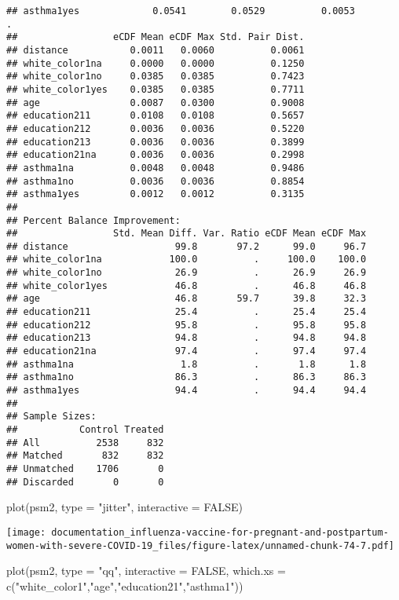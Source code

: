 \documentclass[
]{article}
\newenvironment{Shaded}{\begin{snugshade}}{\end{snugshade}}
\newcommand{\AttributeTok}[1]{\textcolor[rgb]{0.77,0.63,0.00}{#1}}
\newcommand{\ConstantTok}[1]{\textcolor[rgb]{0.00,0.00,0.00}{#1}}
\newcommand{\FunctionTok}[1]{\textcolor[rgb]{0.00,0.00,0.00}{#1}}
\newcommand{\NormalTok}[1]{#1}
\newcommand{\StringTok}[1]{\textcolor[rgb]{0.31,0.60,0.02}{#1}}
\begin{document}
\begin{verbatim}
## asthma1yes             0.0541        0.0529          0.0053          .
##                 eCDF Mean eCDF Max Std. Pair Dist.
## distance           0.0011   0.0060          0.0061
## white_color1na     0.0000   0.0000          0.1250
## white_color1no     0.0385   0.0385          0.7423
## white_color1yes    0.0385   0.0385          0.7711
## age                0.0087   0.0300          0.9008
## education211       0.0108   0.0108          0.5657
## education212       0.0036   0.0036          0.5220
## education213       0.0036   0.0036          0.3899
## education21na      0.0036   0.0036          0.2998
## asthma1na          0.0048   0.0048          0.9486
## asthma1no          0.0036   0.0036          0.8854
## asthma1yes         0.0012   0.0012          0.3135
## 
## Percent Balance Improvement:
##                 Std. Mean Diff. Var. Ratio eCDF Mean eCDF Max
## distance                   99.8       97.2      99.0     96.7
## white_color1na            100.0          .     100.0    100.0
## white_color1no             26.9          .      26.9     26.9
## white_color1yes            46.8          .      46.8     46.8
## age                        46.8       59.7      39.8     32.3
## education211               25.4          .      25.4     25.4
## education212               95.8          .      95.8     95.8
## education213               94.8          .      94.8     94.8
## education21na              97.4          .      97.4     97.4
## asthma1na                   1.8          .       1.8      1.8
## asthma1no                  86.3          .      86.3     86.3
## asthma1yes                 94.4          .      94.4     94.4
## 
## Sample Sizes:
##           Control Treated
## All          2538     832
## Matched       832     832
## Unmatched    1706       0
## Discarded       0       0
\end{verbatim}

\begin{Shaded}
\begin{Highlighting}[]
\FunctionTok{plot}\NormalTok{(psm2, }\AttributeTok{type =} \StringTok{"jitter"}\NormalTok{, }\AttributeTok{interactive =} \ConstantTok{FALSE}\NormalTok{)}
\end{Highlighting}
\end{Shaded}

\texttt{[image: documentation\_influenza-vaccine-for-pregnant-and-postpartum-women-with-severe-COVID-19\_files/figure-latex/unnamed-chunk-74-7.pdf]}

\begin{Shaded}
\begin{Highlighting}[]
\FunctionTok{plot}\NormalTok{(psm2, }\AttributeTok{type =} \StringTok{"qq"}\NormalTok{, }\AttributeTok{interactive =} \ConstantTok{FALSE}\NormalTok{,}
     \AttributeTok{which.xs =} \FunctionTok{c}\NormalTok{(}\StringTok{"white\_color1"}\NormalTok{,}\StringTok{"age"}\NormalTok{,}\StringTok{"education21"}\NormalTok{,}\StringTok{"asthma1"}\NormalTok{))}
\end{Highlighting}
\end{Shaded}
\end{document}
